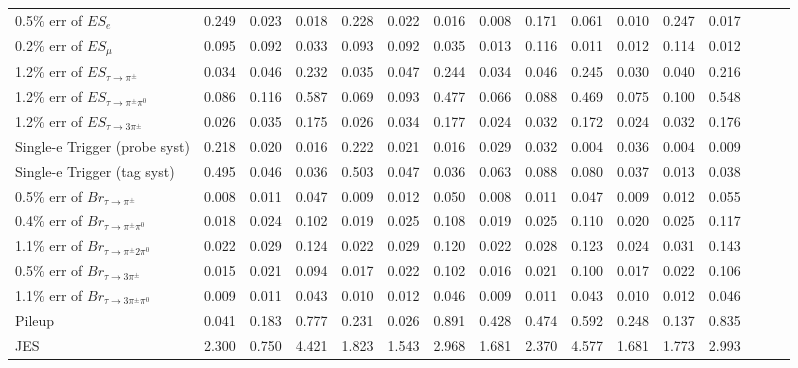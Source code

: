 \begin{table}[]
{\begin{tabular}{|l|ccc|ccc|ccc|ccc|ccc|}
      0.5$\%$ err of $ES_{e}$                    & 0.249 & 0.023 & 0.018 & 0.228 & 0.022 & 0.016 & 0.008 & 0.171 & 0.061 & 0.010 & 0.247 & 0.017 \\ 
      0.2$\%$ err of $ES_{\mu}$                  & 0.095 & 0.092 & 0.033 & 0.093 & 0.092 & 0.035 & 0.013 & 0.116 & 0.011 & 0.012 & 0.114 & 0.012 \\ 
      1.2$\%$ err of $ES_{\tau\to\pi^\pm}$       & 0.034 & 0.046 & 0.232 & 0.035 & 0.047 & 0.244 & 0.034 & 0.046 & 0.245 & 0.030 & 0.040 & 0.216 \\ 
      1.2$\%$ err of $ES_{\tau\to\pi^\pm\pi^0}$  & 0.086 & 0.116 & 0.587 & 0.069 & 0.093 & 0.477 & 0.066 & 0.088 & 0.469 & 0.075 & 0.100 & 0.548 \\ 
      1.2$\%$ err of $ES_{\tau\to3\pi^\pm}$      & 0.026 & 0.035 & 0.175 & 0.026 & 0.034 & 0.177 & 0.024 & 0.032 & 0.172 & 0.024 & 0.032 & 0.176 \\ 
      Single-e Trigger (probe syst)              & 0.218 & 0.020 & 0.016 & 0.222 & 0.021 & 0.016 & 0.029 & 0.032 & 0.004 & 0.036 & 0.004 & 0.009 \\ 
      Single-e Trigger (tag syst)                & 0.495 & 0.046 & 0.036 & 0.503 & 0.047 & 0.036 & 0.063 & 0.088 & 0.080 & 0.037 & 0.013 & 0.038 \\ 
      0.5$\%$ err of $Br_{\tau\to\pi^\pm}$       & 0.008 & 0.011 & 0.047 & 0.009 & 0.012 & 0.050 & 0.008 & 0.011 & 0.047 & 0.009 & 0.012 & 0.055 \\ 
      0.4$\%$ err of $Br_{\tau\to\pi^\pm\pi^0}$  & 0.018 & 0.024 & 0.102 & 0.019 & 0.025 & 0.108 & 0.019 & 0.025 & 0.110 & 0.020 & 0.025 & 0.117 \\ 
      1.1$\%$ err of $Br_{\tau\to\pi^\pm2\pi^0}$ & 0.022 & 0.029 & 0.124 & 0.022 & 0.029 & 0.120 & 0.022 & 0.028 & 0.123 & 0.024 & 0.031 & 0.143 \\ 
      0.5$\%$ err of $Br_{\tau\to3\pi^\pm}$      & 0.015 & 0.021 & 0.094 & 0.017 & 0.022 & 0.102 & 0.016 & 0.021 & 0.100 & 0.017 & 0.022 & 0.106 \\ 
      1.1$\%$ err of $Br_{\tau\to3\pi^\pm\pi^0}$ & 0.009 & 0.011 & 0.043 & 0.010 & 0.012 & 0.046 & 0.009 & 0.011 & 0.043 & 0.010 & 0.012 & 0.046 \\ 
      Pileup                                     & 0.041 & 0.183 & 0.777 & 0.231 & 0.026 & 0.891 & 0.428 & 0.474 & 0.592 & 0.248 & 0.137 & 0.835 \\ 
      JES                                        & 2.300 & 0.750 & 4.421 & 1.823 & 1.543 & 2.968 & 1.681 & 2.370 & 4.577 & 1.681 & 1.773 & 2.993 \\ 

\end{tabular}}
\end{table}
